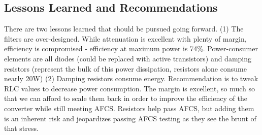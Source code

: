 \documentclass[conference]{IEEEtran}
\begin{document}
\subsection{Lessons Learned and Recommendations}
There are two lessons learned that should be pursued going forward. (1) The filters are over-designed. While attenuation is excellent with plenty of margin, efficiency is compromised - efficiency at maximum power is 74\%. Power-consumer elements are all diodes (could be replaced with active transistors) and damping resistors (represent the bulk of this power dissipation, resistors alone consume nearly 20W)
(2) Damping resistors consume energy. Recommendation is to tweak RLC values to decrease power consumption. The margin is excellent, so much so that we can afford to scale them back in order to improve the efficiency of the converter while still meeting AFCS. Resistors help pass AFCS, but adding them is an inherent risk and jeopardizes passing AFCS testing as they see the brunt of that stress.

\nocite{*}


\end{document}
